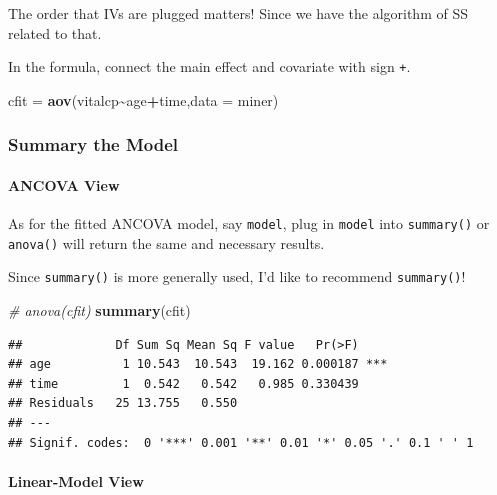 \documentclass[
]{ctexart}
\newenvironment{Shaded}{\begin{snugshade}}{\end{snugshade}}
\newcommand{\AttributeTok}[1]{\textcolor[rgb]{0.13,0.29,0.53}{#1}}
\newcommand{\CommentTok}[1]{\textcolor[rgb]{0.56,0.35,0.01}{\textit{#1}}}
\newcommand{\FunctionTok}[1]{\textcolor[rgb]{0.13,0.29,0.53}{\textbf{#1}}}
\newcommand{\NormalTok}[1]{#1}
\newcommand{\OtherTok}[1]{\textcolor[rgb]{0.56,0.35,0.01}{#1}}
\newcommand{\SpecialCharTok}[1]{\textcolor[rgb]{0.81,0.36,0.00}{\textbf{#1}}}
\begin{document}
The order that IVs are plugged matters! Since we have the algorithm of
SS related to that.

In the formula, connect the main effect and covariate with sign
\texttt{+}.

\begin{Shaded}
\begin{Highlighting}[]
\NormalTok{cfit }\OtherTok{=} \FunctionTok{aov}\NormalTok{(vitalcp}\SpecialCharTok{\textasciitilde{}}\NormalTok{age}\SpecialCharTok{+}\NormalTok{time,}\AttributeTok{data =}\NormalTok{ miner)}
\end{Highlighting}
\end{Shaded}

\hypertarget{summary-the-model}{%
\subsubsection{Summary the Model}\label{summary-the-model}}

\hypertarget{ancova-view}{%
\paragraph{ANCOVA View}\label{ancova-view}}

As for the fitted ANCOVA model, say \texttt{model}, plug in
\texttt{model} into \texttt{summary()} or \texttt{anova()} will return
the same and necessary results.

Since \texttt{summary()} is more generally used, I'd like to recommend
\texttt{summary()}!

\begin{Shaded}
\begin{Highlighting}[]
\CommentTok{\# anova(cfit)}
\FunctionTok{summary}\NormalTok{(cfit)}
\end{Highlighting}
\end{Shaded}

\begin{verbatim}
##             Df Sum Sq Mean Sq F value   Pr(>F)    
## age          1 10.543  10.543  19.162 0.000187 ***
## time         1  0.542   0.542   0.985 0.330439    
## Residuals   25 13.755   0.550                     
## ---
## Signif. codes:  0 '***' 0.001 '**' 0.01 '*' 0.05 '.' 0.1 ' ' 1
\end{verbatim}

\hypertarget{linear-model-view}{%
\paragraph{Linear-Model View}\label{linear-model-view}}
\end{document}
